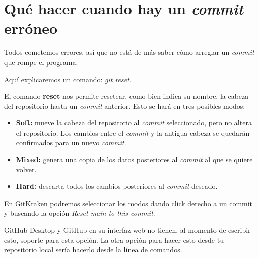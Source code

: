 \section{Qué hacer cuando hay un \textit{commit} erróneo}

Todos cometemos errores, así que no está de más saber cómo arreglar un \textit{commit} que rompe el programa.

Aquí explicaremos un comando: \textit{git reset}.

El comando \textbf{reset} nos permite resetear, como bien indica su nombre, la cabeza del repositorio hasta un \textit{commit} anterior.
Esto se hará en tres posibles modos:
\begin{itemize}
    \item\textbf{Soft:} mueve la cabeza del repositorio al \textit{commit} seleccionado, pero no altera el repositorio. Los cambios entre el \textit{commit} y la antigua cabeza se quedarán confirmados para un nuevo \textit{commit}.
    \item\textbf{Mixed:} genera una copia de los datos posteriores al \textit{commit} al que se quiere volver.
    \item\textbf{Hard:} descarta todos los cambios posteriores al \textit{commit} deseado.
\end{itemize}

En GitKraken podremos seleccionar los modos dando click derecho a un commit y buscando la opción \textit{Reset main to this commit}.

GitHub Desktop y GitHub en su interfaz web no tienen, al momento de escribir esto, soporte para esta opción. La otra opción para hacer esto desde tu repositorio local sería hacerlo desde la línea de comandos.

